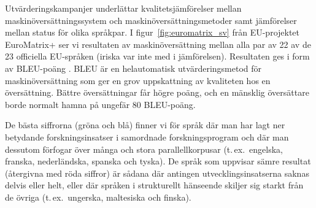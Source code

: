 \begin{multicols}{2}
Utvärderingskampanjer underlättar kvalitetsjämförelser mellan
maskinöversättningssystem och maskinöversättningsmetoder samt
jämförelser mellan status för olika språkpar. I
figur~\ref{fig:euromatrix_sv} från EU-projektet EuroMatrix+ ser vi
resultaten av maskinöversättning mellan alla par av 22 av de 23
officiella EU-språken (iriska var inte med i jämförelsen). Resultaten
ges i form av BLEU-poäng \cite{bleu1}. BLEU är en helautomatisk
utvärderingsmetod för maskinöversättning som ger en grov uppskattning
av kvaliteten hos en översättning. Bättre översättningar får högre
poäng, och en mänsklig översättare borde normalt hamna på ungefär 80
BLEU-poäng.

De bästa siffrorna (gröna och blå) finner vi för språk där man har
lagt ner betydande forskningsinsatser i samordnade forskningsprogram
och där man dessutom förfogar över många och stora parallellkorpusar
(t.\,ex.~engelska, franska, nederländska, spanska och tyska). De språk
som uppvisar sämre resultat (återgivna med röda siffror) är sådana där
antingen utvecklingsinsatserna saknas delvis eller helt, eller där
språken i strukturellt hänseende skiljer sig starkt från de övriga
(t.\,ex.~ungerska, maltesiska och finska).



\end{multicols}
